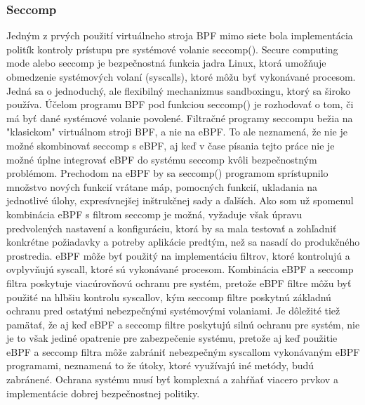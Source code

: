 \subsubsection{Seccomp}
Jedným z prvých použití virtuálneho stroja BPF mimo siete bola implementácia politík kontroly prístupu pre systémové volanie seccomp(). 
Secure computing mode alebo seccomp je bezpečnostná funkcia jadra Linux, ktorá umožňuje obmedzenie systémových volaní (syscalls), 
ktoré môžu byť vykonávané procesom. Jedná sa o jednoduchý, ale flexibilný mechanizmus sandboxingu, ktorý sa široko používa. 
Účelom programu BPF pod funkciou seccomp() je rozhodovať o tom, či má byť dané systémové volanie povolené. Filtračné programy 
seccompu bežia na "klasickom" virtuálnom stroji BPF, a nie na eBPF. To ale neznamená, že nie je možné skombinovať seccomp s eBPF, 
aj keď v čase písania tejto práce nie je možné úplne integrovať eBPF do systému seccomp kvôli bezpečnostným problémom. 
Prechodom na eBPF by sa seccomp() programom sprístupnilo množstvo nových funkcií vrátane máp, pomocných funkcií, ukladania na jednotlivé úlohy, 
expresívnejšej inštrukčnej sady a ďalších. Ako som už spomenul kombinácia eBPF s filtrom seccomp je možná, vyžaduje však úpravu predvolených 
nastavení a konfiguráciu, ktorá by sa mala testovať a zohľadniť konkrétne požiadavky a potreby aplikácie predtým, než sa nasadí do produkčného 
prostredia. eBPF môže byť použitý na implementáciu filtrov, ktoré kontrolujú a ovplyvňujú syscall, ktoré sú vykonávané procesom. 
Kombinácia eBPF a seccomp filtra poskytuje viacúrovňovú ochranu pre systém, pretože eBPF filtre môžu byť použité na hlbšiu kontrolu syscallov, 
kým seccomp filtre poskytnú základnú ochranu pred  ostatými nebezpečnými systémovými volaniami. Je dôležité tiež pamätať, že aj keď eBPF a 
seccomp filtre poskytujú silnú ochranu pre systém, nie je to však jediné opatrenie pre zabezpečenie systému, pretože aj keď použitie eBPF a 
seccomp filtra môže zabrániť nebezpečným syscallom vykonávaným eBPF programami, neznamená to že útoky, ktoré využívajú iné metódy, budú zabránené. 
Ochrana systému musí byť komplexná a zahŕňať viacero prvkov a implementácie dobrej bezpečnostnej politiky.

